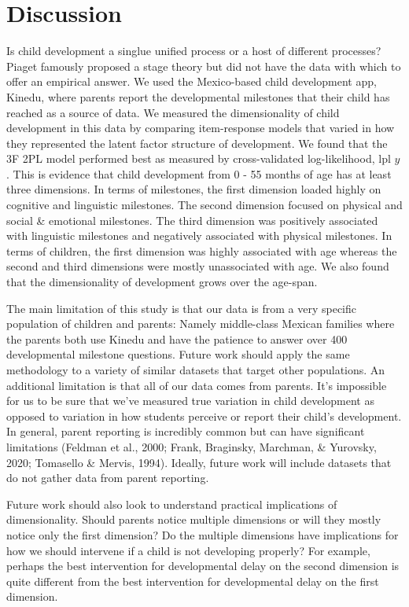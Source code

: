 \documentclass[10pt, letterpaper]{article}
\begin{document}
\hypertarget{discussion}{%
\section{Discussion}\label{discussion}}

Is child development a singlue unified process or a host of different
processes? Piaget famously proposed a stage theory but did not have the
data with which to offer an empirical answer. We used the Mexico-based
child development app, Kinedu, where parents report the developmental
milestones that their child has reached as a source of data. We measured
the dimensionality of child development in this data by comparing
item-response models that varied in how they represented the latent
factor structure of development. We found that the 3F 2PL model
performed best as measured by cross-validated log-likelihood,
\(\text{lpl } y\). This is evidence that child development from 0 - 55
months of age has at least three dimensions. In terms of milestones, the
first dimension loaded highly on cognitive and linguistic milestones.
The second dimension focused on physical and social \& emotional
milestones. The third dimension was positively associated with
linguistic milestones and negatively associated with physical
milestones. In terms of children, the first dimension was highly
associated with age whereas the second and third dimensions were mostly
unassociated with age. We also found that the dimensionality of
development grows over the age-span.

The main limitation of this study is that our data is from a very
specific population of children and parents: Namely middle-class Mexican
families where the parents both use Kinedu and have the patience to
answer over 400 developmental milestone questions. Future work should
apply the same methodology to a variety of similar datasets that target
other populations. An additional limitation is that all of our data
comes from parents. It's impossible for us to be sure that we've
measured true variation in child development as opposed to variation in
how students perceive or report their child's development. In general,
parent reporting is incredibly common but can have significant
limitations (Feldman et al., 2000; Frank, Braginsky, Marchman, \&
Yurovsky, 2020; Tomasello \& Mervis, 1994). Ideally, future work will
include datasets that do not gather data from parent reporting.

Future work should also look to understand practical implications of
dimensionality. Should parents notice multiple dimensions or will they
mostly notice only the first dimension? Do the multiple dimensions have
implications for how we should intervene if a child is not developing
properly? For example, perhaps the best intervention for developmental
delay on the second dimension is quite different from the best
intervention for developmental delay on the first dimension.
\end{document}
